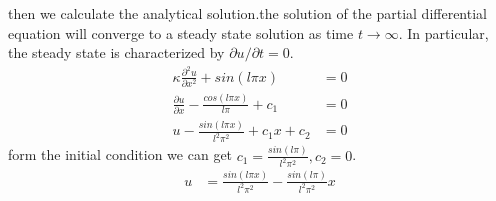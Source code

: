 \documentclass[a4paper]{article}
\begin{document}
        then we calculate the analytical solution.the solution of the partial differential equation will converge to a steady state solution as time $t \rightarrow \infty$. In particular, the steady state is characterized by $\partial u / \partial t = 0$. 
        \begin{align*}
            \kappa  \frac{\partial^2 u}{\partial x^2} + sin(l\pi x) &= 0 \\
            \frac{\partial u}{\partial x} - \frac{cos(l \pi x)}{l \pi} + c_1 &= 0 \\
            u - \frac{sin(l \pi x)}{l^2\pi^2} + c_1x + c_2 &= 0
        \end{align*}
        form the initial condition we can get $c_1 = \frac{sin(l \pi)}{l^2 \pi^2}, c_2 = 0 $.
        \begin{align*}
            u &= \frac{sin(l \pi x)}{l^2\pi^2} - \frac{sin(l \pi)}{l^2 \pi^2}x
        \end{align*}
\end{document}
